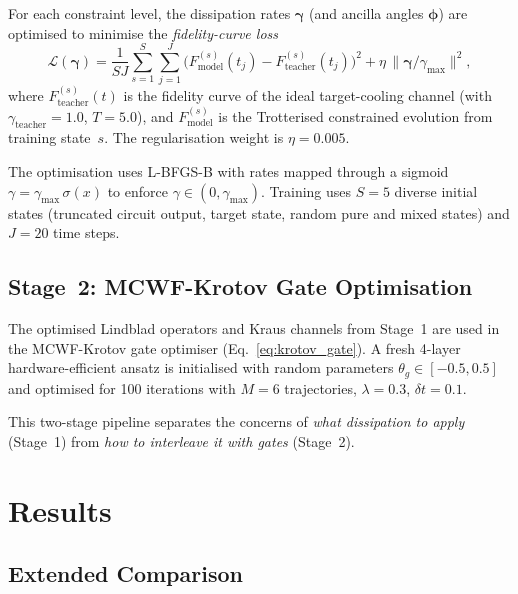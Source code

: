 \documentclass[11pt,a4paper]{article}
\begin{document}
For each constraint level, the dissipation rates
$\boldsymbol\gamma$ (and ancilla angles $\boldsymbol\phi$) are
optimised to minimise the \emph{fidelity-curve loss}
\begin{equation}
\mathcal{L}(\boldsymbol\gamma)
= \frac{1}{SJ}\sum_{s=1}^{S}\sum_{j=1}^{J}
\bigl(F_\text{model}^{(s)}(t_j) - F_\text{teacher}^{(s)}(t_j)\bigr)^2
+ \eta\,\|\boldsymbol\gamma / \gamma_\text{max}\|^2,
\label{eq:fit_loss}
\end{equation}
where $F_\text{teacher}^{(s)}(t)$ is the fidelity curve of the ideal
target-cooling channel (with $\gamma_\text{teacher} = 1.0$,
$T = 5.0$), and $F_\text{model}^{(s)}$ is the Trotterised
constrained evolution from training state~$s$.
The regularisation weight is $\eta = 0.005$.

The optimisation uses L-BFGS-B with rates mapped through a sigmoid
$\gamma = \gamma_\text{max}\,\sigma(x)$ to enforce
$\gamma \in (0, \gamma_\text{max})$.  Training uses $S = 5$ diverse
initial states (truncated circuit output, target state, random pure
and mixed states) and $J = 20$ time steps.

\subsection{Stage~2: MCWF-Krotov Gate Optimisation}

The optimised Lindblad operators and Kraus channels from Stage~1 are
used in the MCWF-Krotov gate optimiser
(Eq.~\ref{eq:krotov_gate}).  A fresh 4-layer hardware-efficient ansatz is
initialised with random parameters $\theta_g \in [-0.5, 0.5]$ and
optimised for 100 iterations with $M = 6$ trajectories,
$\lambda = 0.3$, $\delta t = 0.1$.

This two-stage pipeline separates the concerns of
\emph{what dissipation to apply} (Stage~1) from
\emph{how to interleave it with gates} (Stage~2).


\section{Results}

\subsection{Extended Comparison}
\end{document}
